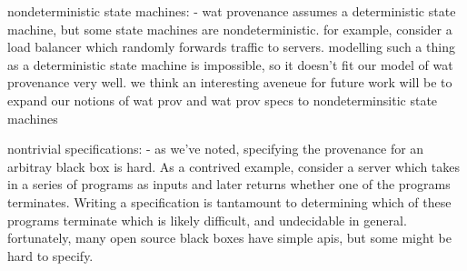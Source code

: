 nondeterministic state machines:
  - wat provenance assumes a deterministic state machine, but some state machines are nondeterministic. for example, consider a load balancer which randomly forwards traffic to servers. modelling such a thing as a deterministic state machine is impossible, so it doesn't fit our model of wat provenance very well. we think an interesting aveneue for future work will be to expand our notions of wat prov and wat prov specs to nondeterminsitic state machines

nontrivial specifications:
  - as we've noted, specifying the provenance for an arbitray black box is hard. As a contrived example, consider a server which takes in a series of programs as inputs and later returns whether one of the programs terminates. Writing a specification is tantamount to determining which of these programs terminate which is likely difficult, and undecidable in general. fortunately, many open source black boxes have simple apis, but some might be hard to specify.
